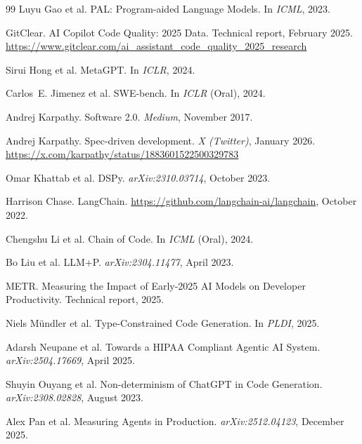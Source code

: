 \documentclass[11pt]{article}
\begin{document}
\begin{thebibliography}{99}
Luyu Gao et al. PAL: Program-aided Language Models. In \emph{ICML}, 2023.

GitClear. AI Copilot Code Quality: 2025 Data. Technical report, February 2025.
\newblock \url{https://www.gitclear.com/ai_assistant_code_quality_2025_research}

Sirui Hong et al. MetaGPT. In \emph{ICLR}, 2024.

Carlos~E. Jimenez et al. SWE-bench. In \emph{ICLR} (Oral), 2024.

Andrej Karpathy. Software 2.0. \emph{Medium}, November 2017.

Andrej Karpathy. Spec-driven development. \emph{X (Twitter)}, January 2026.
\newblock \url{https://x.com/karpathy/status/1883601522500329783}

Omar Khattab et al. DSPy. \emph{arXiv:2310.03714}, October 2023.

Harrison Chase. LangChain. \url{https://github.com/langchain-ai/langchain}, October 2022.

Chengshu Li et al. Chain of Code. In \emph{ICML} (Oral), 2024.

Bo Liu et al. LLM+P. \emph{arXiv:2304.11477}, April 2023.

METR. Measuring the Impact of Early-2025 AI Models on Developer Productivity. Technical report, 2025.

Niels M\"{u}ndler et al. Type-Constrained Code Generation. In \emph{PLDI}, 2025.

Adarsh Neupane et al. Towards a HIPAA Compliant Agentic AI System. \emph{arXiv:2504.17669}, April 2025.

Shuyin Ouyang et al. Non-determinism of ChatGPT in Code Generation. \emph{arXiv:2308.02828}, August 2023.

Alex Pan et al. Measuring Agents in Production. \emph{arXiv:2512.04123}, December 2025.


\end{thebibliography}
\end{document}
